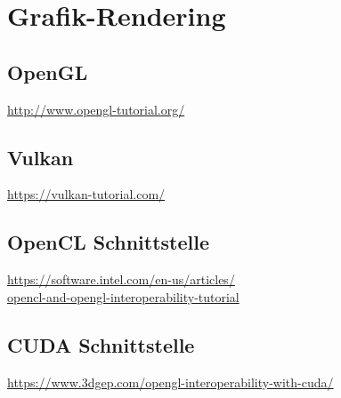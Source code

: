 	\chapter{Grafik-Rendering}
		\section{OpenGL}
		\url{http://www.opengl-tutorial.org/}	
		
		\section{Vulkan}
		\url{https://vulkan-tutorial.com/}	
		
		\section{OpenCL Schnittstelle}	
		\href{https://software.intel.com/en-us/articles/opencl-and-opengl-interoperability-tutorial}{https://software.intel.com/en-us/articles/ \\ opencl-and-opengl-interoperability-tutorial}	
		
		\section{CUDA Schnittstelle}
		\url{https://www.3dgep.com/opengl-interoperability-with-cuda/}	